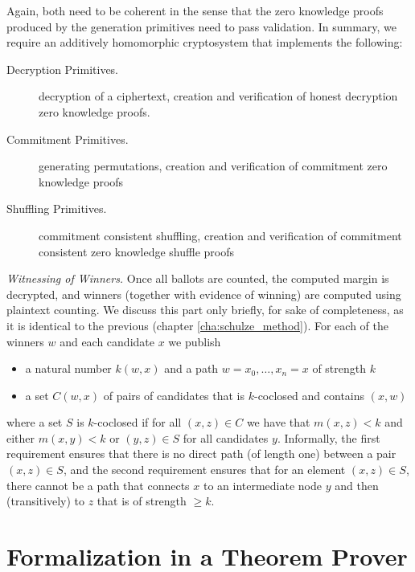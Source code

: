 \noindent
Again, both need to be coherent in the sense that the zero knowledge
proofs produced by the generation primitives need to pass
validation. In summary, we require an additively homomorphic
cryptosystem that implements the following:

\begin{description}
\item[Decryption Primitives.]
  decryption of a ciphertext, creation and verification of
 honest decryption zero knowledge proofs. 

\item[Commitment Primitives.]
  generating permutations, creation and verification of commitment
  zero knowledge proofs
\item[Shuffling Primitives.]
  commitment consistent shuffling, creation and verification of
  commitment consistent zero knowledge shuffle proofs 
\end{description}

\smallskip\noindent\emph{Witnessing of Winners.}
Once all ballots are counted, the computed margin is decrypted, and
winners (together with evidence of winning) are computed using 
plaintext counting. We discuss this part only briefly, for sake of completeness,
 as it is identical to the previous (chapter \ref{cha:schulze_method}).
 For each of the winners $w$ and each
candidate $x$ we publish
\begin{itemize}
\item a natural number $k(w, x)$ and a path $w = x_0, \dots, x_n = x$ of strength $k$
\item a set $C(w, x)$ of pairs of candidates that is $k$-coclosed
and contains $(x, w)$
\end{itemize}
where a set $S$ is  $k$-coclosed if for all $(x,z) \in C$ we have
that $m(x, z) < k$ and either $m(x, y) < k$ or $(y,z) \in S$ for
all candidates $y$.  Informally, the first requirement ensures that
there is no direct path (of length one) between a pair $(x, z) \in
S$, and the second requirement ensures that for an element $(x, z)
\in S$, there cannot be a path that connects $x$ to an intermediate
node $y$ and then (transitively) to $z$ that is of strength $\geq
k$.


\section{Formalization in a Theorem Prover} \label{sec:realisation}



